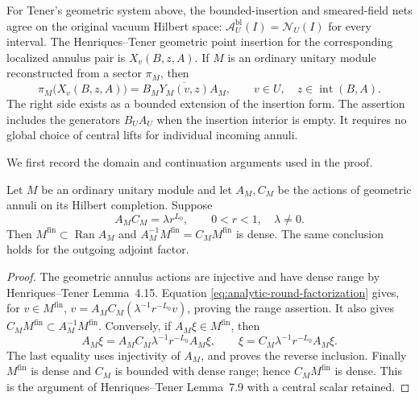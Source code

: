 \begin{proposition}
\label{clm:analytic-annulus}
For Tener's geometric system above, the bounded-insertion and
smeared-field nets agree on the original vacuum Hilbert space:
$\mathcal A_U^{\mathrm{bl}}(I)=\mathcal N_U(I)$ for every interval.
The Henriques--Tener geometric point insertion for the corresponding
localized annulus pair is $X_v(B,z,A)$.  If $M$ is an ordinary
unitary module reconstructed from a sector $\pi_M$, then
\begin{equation}
 \pi_M\bigl(X_v(B,z,A)\bigr)
   =\overline{B_MY_M(v,z)A_M},
 \qquad v\in U,\quad z\in\operatorname{int}(B,A).
 \label{eq:analytic-annulus-identity}
\end{equation}
The right side exists as a bounded extension of the insertion form.
The assertion includes the generators $B_UA_U$ when the insertion
interior is empty.  It requires no global choice of central lifts for
individual incoming annuli.
\end{proposition}

We first record the domain and continuation arguments used in the proof.

\begin{lemma}
\label{lem:analytic-inverse-domain}
Let $M$ be an ordinary unitary module and let $A_M,C_M$ be the actions
of geometric annuli on its Hilbert completion.  Suppose
\begin{equation}
 A_MC_M=\lambda r^{L_0},\qquad 0<r<1,\quad\lambda\ne0.
 \label{eq:analytic-round-factorization}
\end{equation}
Then $M^{\mathrm{fin}}\subset\operatorname{Ran}A_M$ and
$A_M^{-1}M^{\mathrm{fin}}=C_M M^{\mathrm{fin}}$ is dense.
The same conclusion holds for the outgoing adjoint factor.
\end{lemma}
\begin{proof}
The geometric annulus actions are injective and have dense range by
Henriques--Tener Lemma~4.15.  Equation
\eqref{eq:analytic-round-factorization} gives, for $v\in M^{\mathrm{fin}}$,
$v=A_MC_M(\lambda^{-1}r^{-L_0}v)$, proving the range assertion.
It also gives
$C_M M^{\mathrm{fin}}\subset A_M^{-1}M^{\mathrm{fin}}$.
Conversely, if $A_M\xi\in M^{\mathrm{fin}}$, then
\[
 A_M\xi
  =A_MC_M\lambda^{-1}r^{-L_0}A_M\xi,
 \qquad
 \xi=C_M\lambda^{-1}r^{-L_0}A_M\xi.
\]
The last equality uses injectivity of $A_M$, and proves the reverse
inclusion.  Finally $M^{\mathrm{fin}}$ is dense and $C_M$ is bounded
with dense range; hence $C_M M^{\mathrm{fin}}$ is dense.  This is the
argument of Henriques--Tener Lemma~7.9 with a central scalar retained.
\end{proof}

